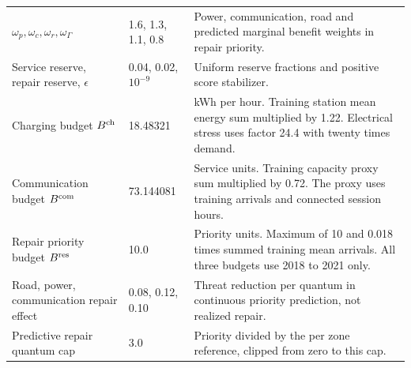 \begin{table}[p]
\begin{tabular}{@{}p{}p{}p{}@{}}
$\omega_p,\omega_c,\omega_r,\omega_\Gamma$ & 1.6, 1.3, 1.1, 0.8 & Power, communication, road and predicted marginal benefit weights in repair priority. \\
Service reserve, repair reserve, $\epsilon$ & 0.04, 0.02, $10^{-9}$ & Uniform reserve fractions and positive score stabilizer. \\
Charging budget $B^{\rm ch}$ & 18.48321 & kWh per hour. Training station mean energy sum multiplied by 1.22. Electrical stress uses factor 24.4 with twenty times demand. \\
Communication budget $B^{\rm com}$ & 73.144081 & Service units. Training capacity proxy sum multiplied by 0.72. The proxy uses training arrivals and connected session hours. \\
Repair priority budget $B^{\rm res}$ & 10.0 & Priority units. Maximum of 10 and 0.018 times summed training mean arrivals. All three budgets use 2018 to 2021 only. \\
Road, power, communication repair effect & 0.08, 0.12, 0.10 & Threat reduction per quantum in continuous priority prediction, not realized repair. \\
Predictive repair quantum cap & 3.0 & Priority divided by the per zone reference, clipped from zero to this cap. \\
\bottomrule\end{tabular}
\end{table}

